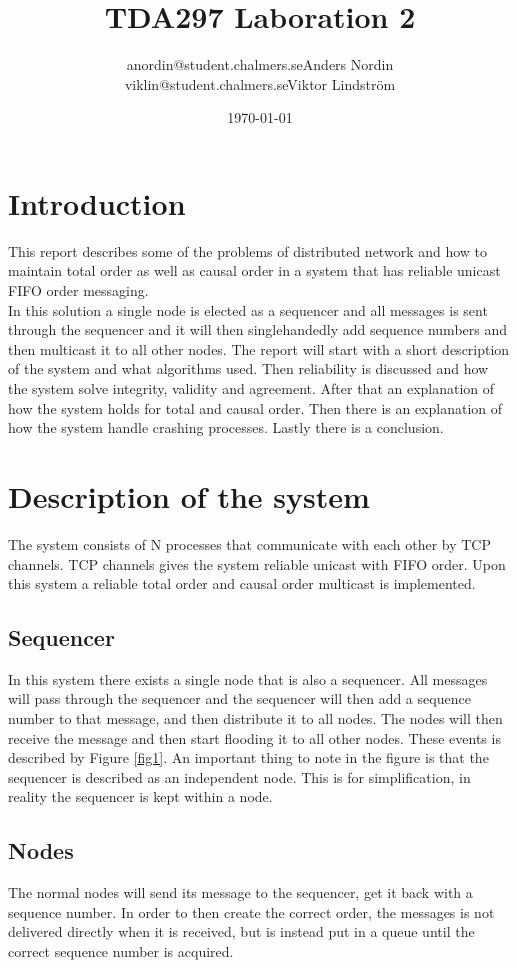 \documentclass{article}
\title{TDA297 Laboration 2}
\author{anordin@student.chalmers.se\quad Anders Nordin\\
        viklin@student.chalmers.se\quad Viktor Lindstr\"{o}m}
\date{\today}
\begin{document}
\maketitle
\newpage

\section{Introduction}
  This report describes some of the problems of distributed network and how to maintain total order 
  as well as causal order in a system that has reliable unicast FIFO order messaging.\\
  In this solution a single node is elected as a sequencer and all messages is sent through
  the sequencer and it will then singlehandedly add sequence numbers and then multicast it
  to all other nodes.
  The report will start with a short description of the system and what algorithms used. 
  Then reliability is discussed and how the system solve integrity, validity and agreement.
  After that an explanation of how the system holds for total and causal order. Then there 
  is an explanation of how the system handle crashing processes. Lastly there is a conclusion.

\section{Description of the system}
 The system consists of N processes that communicate with each other by TCP channels.
 TCP channels gives the system reliable unicast with FIFO order. Upon this system a
 reliable total order and causal order multicast is implemented. 
 \subsection{Sequencer}
 In this system there exists a single node that is also a sequencer. All messages will 
 pass through the sequencer and the sequencer will then add a sequence number to that 
 message, and then distribute it to all nodes. The nodes will then receive the message 
 and then start flooding it to all other nodes. These events is described by Figure 
 \ref{fig1}. An important thing to note in the figure is that the sequencer is described 
 as an independent node. This is for simplification, in reality the sequencer is kept 
 within a node. \\
 \subsection{Nodes}
 The normal nodes will send its message to the sequencer, get it back with a sequence number.
 In order to then create the correct order, the messages is not delivered directly when
 it is received, but is instead put in a queue until the correct sequence number is acquired.\\
\end{document}
